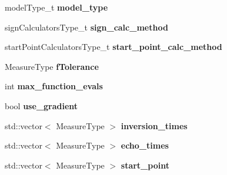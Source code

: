 \begin{DoxyCompactItemize}
\item 
\hypertarget{struct_ox_1_1_tomato_options_a4a5e32c79e597006aaaa79600ddaa564}{model\-Type\-\_\-t {\bfseries model\-\_\-type}}\label{struct_ox_1_1_tomato_options_a4a5e32c79e597006aaaa79600ddaa564}

\item 
\hypertarget{struct_ox_1_1_tomato_options_a2cf923d6d04fb8cb510db2623e93119d}{sign\-Calculators\-Type\-\_\-t {\bfseries sign\-\_\-calc\-\_\-method}}\label{struct_ox_1_1_tomato_options_a2cf923d6d04fb8cb510db2623e93119d}

\item 
\hypertarget{struct_ox_1_1_tomato_options_a9da2993961d10c848b0860284900c869}{start\-Point\-Calculators\-Type\-\_\-t {\bfseries start\-\_\-point\-\_\-calc\-\_\-method}}\label{struct_ox_1_1_tomato_options_a9da2993961d10c848b0860284900c869}

\item 
\hypertarget{struct_ox_1_1_tomato_options_ae2ac4c46e46b4d183c6944771701040b}{Measure\-Type {\bfseries f\-Tolerance}}\label{struct_ox_1_1_tomato_options_ae2ac4c46e46b4d183c6944771701040b}

\item 
\hypertarget{struct_ox_1_1_tomato_options_a9b864c01b6b0b4e4d5a56470f6c5f004}{int {\bfseries max\-\_\-function\-\_\-evals}}\label{struct_ox_1_1_tomato_options_a9b864c01b6b0b4e4d5a56470f6c5f004}

\item 
\hypertarget{struct_ox_1_1_tomato_options_a367c540e5413f8ffa3a6bc6ef5781b45}{bool {\bfseries use\-\_\-gradient}}\label{struct_ox_1_1_tomato_options_a367c540e5413f8ffa3a6bc6ef5781b45}

\item 
\hypertarget{struct_ox_1_1_tomato_options_ab7ac986b6ad257e73eda3d524f85fe85}{std\-::vector$<$ Measure\-Type $>$ {\bfseries inversion\-\_\-times}}\label{struct_ox_1_1_tomato_options_ab7ac986b6ad257e73eda3d524f85fe85}

\item 
\hypertarget{struct_ox_1_1_tomato_options_ae70219d5c42877178575baa5d6ae51c3}{std\-::vector$<$ Measure\-Type $>$ {\bfseries echo\-\_\-times}}\label{struct_ox_1_1_tomato_options_ae70219d5c42877178575baa5d6ae51c3}

\item 
\hypertarget{struct_ox_1_1_tomato_options_a0eced6fbbc1270e5d437a18ba950c06c}{std\-::vector$<$ Measure\-Type $>$ {\bfseries start\-\_\-point}}\label{struct_ox_1_1_tomato_options_a0eced6fbbc1270e5d437a18ba950c06c}


\end{DoxyCompactItemize}
